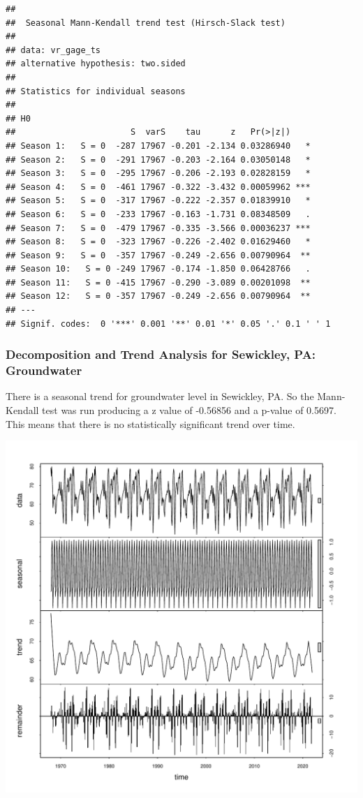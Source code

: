 \documentclass[
  12pt,
]{article}
\begin{document}
\begin{verbatim}
## 
##  Seasonal Mann-Kendall trend test (Hirsch-Slack test)
## 
## data: vr_gage_ts
## alternative hypothesis: two.sided
## 
## Statistics for individual seasons
## 
## H0
##                       S  varS    tau      z   Pr(>|z|)    
## Season 1:   S = 0  -287 17967 -0.201 -2.134 0.03286940   *
## Season 2:   S = 0  -291 17967 -0.203 -2.164 0.03050148   *
## Season 3:   S = 0  -295 17967 -0.206 -2.193 0.02828159   *
## Season 4:   S = 0  -461 17967 -0.322 -3.432 0.00059962 ***
## Season 5:   S = 0  -317 17967 -0.222 -2.357 0.01839910   *
## Season 6:   S = 0  -233 17967 -0.163 -1.731 0.08348509   .
## Season 7:   S = 0  -479 17967 -0.335 -3.566 0.00036237 ***
## Season 8:   S = 0  -323 17967 -0.226 -2.402 0.01629460   *
## Season 9:   S = 0  -357 17967 -0.249 -2.656 0.00790964  **
## Season 10:   S = 0 -249 17967 -0.174 -1.850 0.06428766   .
## Season 11:   S = 0 -415 17967 -0.290 -3.089 0.00201098  **
## Season 12:   S = 0 -357 17967 -0.249 -2.656 0.00790964  **
## ---
## Signif. codes:  0 '***' 0.001 '**' 0.01 '*' 0.05 '.' 0.1 ' ' 1
\end{verbatim}

\newpage

\hypertarget{decomposition-and-trend-analysis-for-sewickley-pa-groundwater}{%
\subsubsection{Decomposition and Trend Analysis for Sewickley, PA:
Groundwater}\label{decomposition-and-trend-analysis-for-sewickley-pa-groundwater}}

There is a seasonal trend for groundwater level in Sewickley, PA. So the
Mann-Kendall test was run producing a z value of -0.56856 and a p-value
of 0.5697. This means that there is no statistically significant trend
over time.

\includegraphics{Elliott_WDA_Project_files/figure-latex/seasonality_4-1.pdf}
\end{document}

